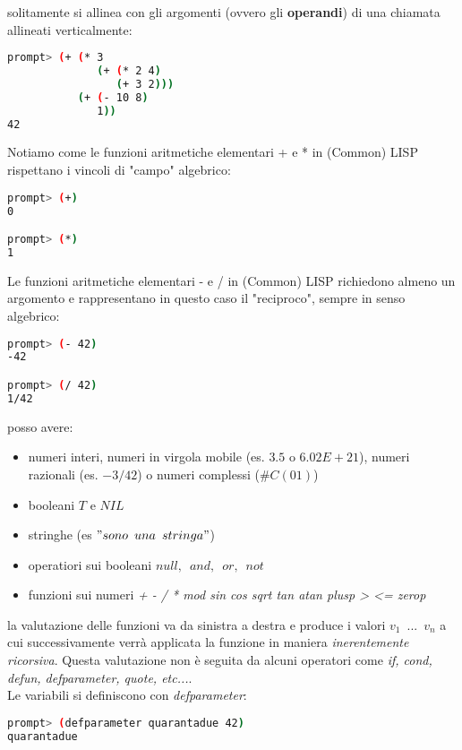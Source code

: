 \documentclass[a4paper,12pt, oneside]{book}
\begin{document}
solitamente si allinea con gli argomenti (ovvero gli \textbf{operandi}) di una chiamata allineati verticalmente:
\begin{shaded}
\begin{lstlisting}[language=bash]
prompt> (+ (* 3
              (+ (* 2 4)
                 (+ 3 2)))
           (+ (- 10 8)
              1))
42
\end{lstlisting}
\end{shaded}
Notiamo come le funzioni aritmetiche elementari + e * in (Common) LISP
rispettano i vincoli di "campo" algebrico:
\begin{shaded}
\begin{lstlisting}[language=bash]
prompt> (+)
0

prompt> (*)
1
\end{lstlisting}
\end{shaded}
Le funzioni aritmetiche elementari - e / in (Common) LISP richiedono almeno
un argomento e rappresentano in questo caso il "reciproco", sempre in senso
algebrico:
\begin{shaded}
\begin{lstlisting}[language=bash]
prompt> (- 42)
-42

prompt> (/ 42)
1/42
\end{lstlisting}
\end{shaded}
posso avere:
\begin{itemize}
\item numeri interi, numeri in virgola mobile (es. $3.5$ o $6.02E+21$), numeri razionali (es. $-3/42$) o numeri complessi ($\#C (0 1)$)
\item booleani $T$ e $NIL$
\item stringhe (es $"sono\,\,\, una \,\,\,stringa"$)
\item operatiori sui booleani $null,\,\,\,and,\,\,\, or,\,\,\,not$
\item funzioni sui numeri \textit{+ - / * mod sin cos sqrt tan atan plusp > <= zerop}
\end{itemize}
la valutazione delle funzioni va da sinistra a destra e produce i valori $v_1\,\,\,...\,\,\, v_n$ a cui successivamente verrà applicata la funzione in maniera \textit{inerentemente ricorsiva}. Questa valutazione non è seguita da alcuni operatori come \textit{if, cond, defun, defparameter, quote, etc...}.\\
Le variabili si definiscono con \textit{defparameter}:
\begin{shaded}
\begin{lstlisting}[language=bash]
prompt> (defparameter quarantadue 42)
quarantadue
\end{lstlisting}
\end{shaded}
\end{document}
